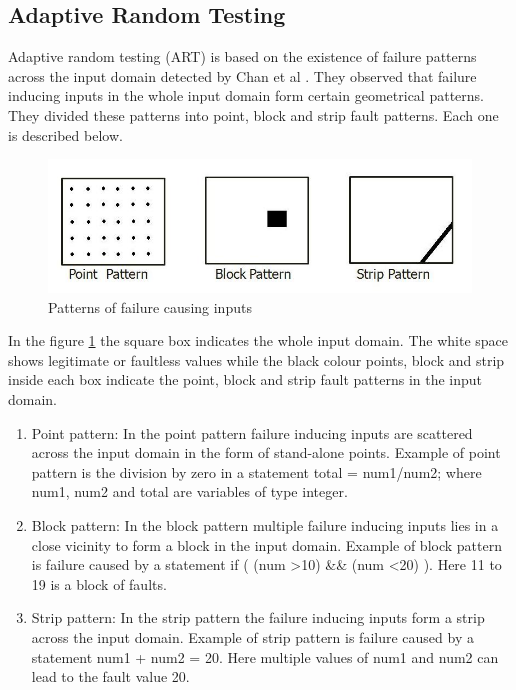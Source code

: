 \subsection{Adaptive Random Testing}
Adaptive random testing (ART) \cite{Chen2008} is based on the existence of failure patterns across the input domain detected by Chan et al \cite{Chan1996}. They observed that failure inducing inputs in the whole input domain form certain geometrical patterns. They divided these patterns into point, block and strip fault patterns. Each one is described below.

\begin{figure}[h]
	\centering
	\includegraphics[scale=0.5]{Literature/pointblockstrip}
	\caption{Patterns of failure causing inputs}
	\label{fig:patterns}
\end{figure}

In the figure \ref{fig:patterns} the square box indicates the whole input domain. The white space shows legitimate or faultless values while the black colour points, block and strip inside each box indicate the point, block and strip fault patterns in the input domain.

\begin{enumerate}
\item Point pattern: In the point pattern failure inducing inputs are scattered across the input domain in the form of stand-alone points. Example of point pattern is the division by zero in a statement total = num1/num2; where num1, num2 and total are variables of type integer. 
\item Block pattern: In the block pattern multiple failure inducing inputs lies in a close vicinity to form a block in the input domain. Example of block pattern is failure caused by a statement if ( (num \textgreater 10) \&\& (num \textless 20) ). Here 11 to 19 is a block of faults.
\item Strip pattern: In the strip pattern the failure inducing inputs form a strip across the input domain. Example of strip pattern is failure caused by a statement num1 + num2 = 20. Here multiple values of num1 and num2 can lead to the fault value 20.
\end{enumerate}

